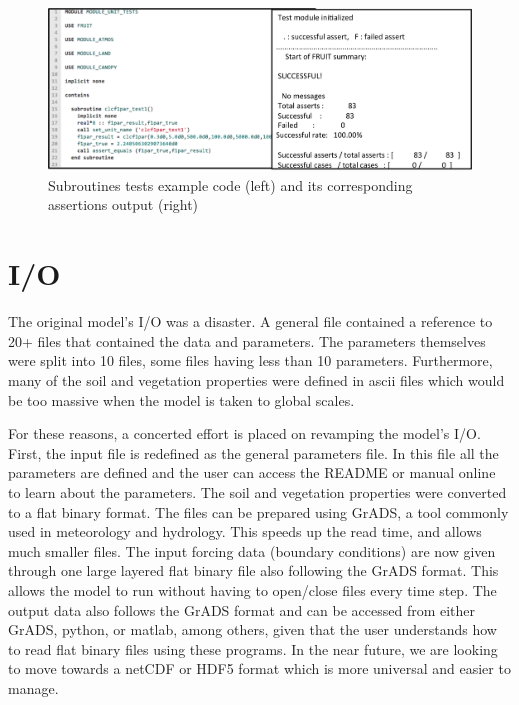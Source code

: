 \documentclass[pdftex,12pt,a4paper]{article}
\begin{document}
\begin{figure}[h]
	\centering
	\includegraphics[width=5.5in]{Figures/Tests2.png}
	\caption{Subroutines tests example code (left) and its corresponding assertions output (right)}
	\label{Tests1}
\end{figure}

\section{I/O}

The original model's I/O was a disaster. A general file contained a reference to 20+ files that contained the data and parameters. The parameters themselves were split into 10 files, some files having less than 10 parameters. Furthermore, many of the soil and vegetation properties were defined in ascii files which would be too massive when the model is taken to global scales. 

\vspace{1em}

For these reasons, a concerted effort is placed on revamping the model's I/O. First, the input file is redefined as the general parameters file. In this file all the parameters are defined and the user can access the README or manual online to learn about the parameters. The soil and vegetation properties were converted to a flat binary format. The files can be prepared using GrADS, a tool commonly used in meteorology and hydrology. This speeds up the read time, and allows much smaller files. The input forcing data (boundary conditions) are now given through one large layered flat binary file also following the GrADS format. This allows the model to run without having to open/close files every time step. The output data also follows the GrADS format and can be accessed from either GrADS, python, or matlab, among others, given that the user understands how to read flat binary files using these programs. In the near future, we are looking to move towards a netCDF or HDF5 format which is more universal and easier to manage.
\end{document}
